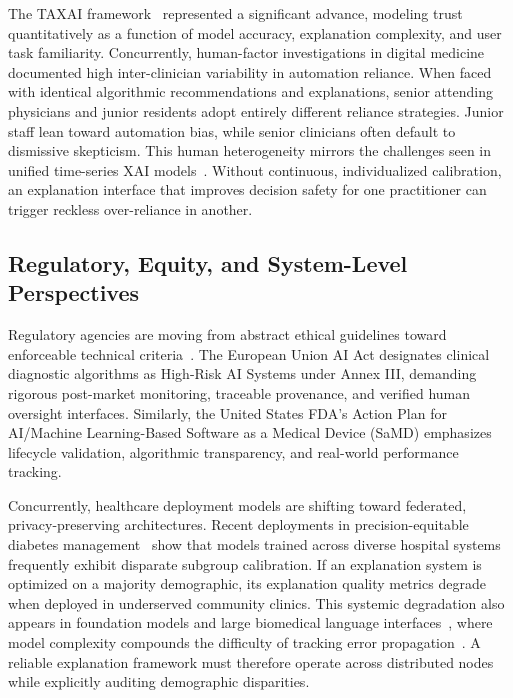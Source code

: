 \documentclass[10pt,journal,compsoc]{IEEEtran}
\begin{document}
The TAXAI framework~\cite{balayan2026taxai} represented a significant advance, modeling trust quantitatively as a function of model accuracy, explanation complexity, and user task familiarity. Concurrently, human-factor investigations in digital medicine~\cite{jacobs2025human} documented high inter-clinician variability in automation reliance. When faced with identical algorithmic recommendations and explanations, senior attending physicians and junior residents adopt entirely different reliance strategies. Junior staff lean toward automation bias, while senior clinicians often default to dismissive skepticism. This human heterogeneity mirrors the challenges seen in unified time-series XAI models~\cite{tonutti2026unified}. Without continuous, individualized calibration, an explanation interface that improves decision safety for one practitioner can trigger reckless over-reliance in another.

\subsection{Regulatory, Equity, and System-Level Perspectives}
Regulatory agencies are moving from abstract ethical guidelines toward enforceable technical criteria~\cite{char2025xai}. The European Union AI Act designates clinical diagnostic algorithms as High-Risk AI Systems under Annex III, demanding rigorous post-market monitoring, traceable provenance, and verified human oversight interfaces. Similarly, the United States FDA's Action Plan for AI/Machine Learning-Based Software as a Medical Device (SaMD) emphasizes lifecycle validation, algorithmic transparency, and real-world performance tracking.

Concurrently, healthcare deployment models are shifting toward federated, privacy-preserving architectures. Recent deployments in precision-equitable diabetes management~\cite{moreno2025federated} show that models trained across diverse hospital systems frequently exhibit disparate subgroup calibration. If an explanation system is optimized on a majority demographic, its explanation quality metrics degrade when deployed in underserved community clinics. This systemic degradation also appears in foundation models and large biomedical language interfaces~\cite{rajpurkar2025llm, eusc2026trends}, where model complexity compounds the difficulty of tracking error propagation~\cite{thurner2026decoding}. A reliable explanation framework must therefore operate across distributed nodes while explicitly auditing demographic disparities.
\end{document}
